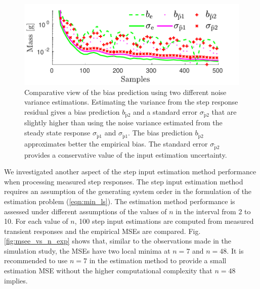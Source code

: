 \begin{figure}[!htb]
\centering
\includegraphics[width=1.0\columnwidth]{./ChapterExperimentalValidation/fig/Fig_11.pdf} 
\caption{ \label{fig:b_sigma_exp_str2} 
Comparative view of the bias prediction using two different noise variance estimations. 
Estimating the variance from the step response residual gives a bias prediction $b_{\widetilde{\mathrm{p}}2}$ and a standard error $\sigma_{\widetilde{\mathrm{p}}2}$ that are slightly higher than using the noise variance estimated from the steady state response $\sigma_{\widetilde{\mathrm{p}}1}$ and $\sigma_{\widetilde{\mathrm{p}}1}$. 
The bias prediction $b_{\widetilde{\mathrm{p}}2}$ approximates better the empirical bias. 
The standard error $\sigma_{\widetilde{\mathrm{p}}2}$ provides a conservative value of the input estimation uncertainty. }
\end{figure}


We investigated another aspect of the step input estimation method performance when processing measured step responses.
The step input estimation method requires an assumption of the generating system order in the formulation of the estimation problem (\ref{eqn:min_ls}).
The estimation method performance is assessed under different assumptions of the values of $n$ in the interval from 2 to 10. 
For each value of $n$, 100 step input estimations are computed from measured transient responses and the empirical MSEs are compared.
Fig. \ref{fig:msee_vs_n_exp} shows that, similar to the observations made in the simulation study, the MSEs have two local minima at $n=7$ and $n=48$.
It is recommended to use $n = 7$ in the estimation method to provide a small estimation MSE without the higher computational complexity that $n=48$ implies.


